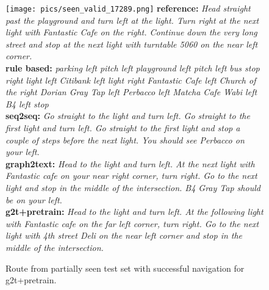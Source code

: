 \documentclass[11pt,a4paper]{article}
\begin{document}
\begin{figure*}[ht]
    \texttt{[image: pics/seen\_valid\_17289.png]}
    \scriptsize
    \textbf{reference:} \textit{Head straight past the playground and turn left at the light. Turn right at the next light with Fantastic Cafe on the right. Continue down the very long street and stop at the next light with turntable 5060 on the near left corner.} \\
    \textbf{rule based:} \textit{parking left pitch left playground left pitch left bus stop right light left Citibank left light right Fantastic Cafe left Church of the right Dorian Gray Tap left Perbacco left Matcha Cafe Wabi left B4 left stop}\\
    \textbf{seq2seq:} \textit{Go straight to the light and turn left. Go straight to the first light and turn left. Go straight to the first light and stop a couple of steps before the next light. You should see Perbacco on your left.}\\
    \textbf{graph2text:} \textit{Head to the light and turn left. At the next light with Fantastic cafe on your near right corner, turn right. Go to the next light and stop in the middle of the intersection. B4 Gray Tap should be on your left.}\\
    \textbf{g2t+pretrain:} \textit{Head to the light and turn left. At the following light with Fantastic cafe on the far left corner, turn right. Go to the next light with 4th street Deli on the near left corner and stop in the middle of the intersection.}
    \caption{Route from partially seen test set with successful navigation for g2t+pretrain.}
\end{figure*}
\end{document}
